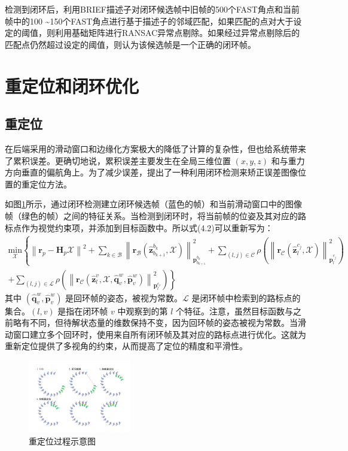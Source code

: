 检测到闭环后，利用BRIEF描述子对闭环候选帧中旧帧的500个FAST角点和当前帧中的100 \textasciitilde 150个FAST角点进行基于描述子的邻域匹配，如果匹配的点对大于设定的阈值，则利用基础矩阵进行RANSAC异常点剔除。如果经过异常点剔除后的匹配点仍然超过设定的阈值，则认为该候选帧是一个正确的闭环帧。
\section{重定位和闭环优化}
\subsection{重定位}
在后端采用的滑动窗口和边缘化方案极大的降低了计算的复杂性，但也给系统带来了累积误差。更确切地说，累积误差主要发生在全局三维位置 $(x,y,z) $ 和与重力方向垂直的偏航角上。为了减少误差，提出了一种利用闭环检测来矫正误差图像位置的重定位方法。

如图\ref{fig4_8}所示，通过闭环检测建立闭环候选帧（蓝色的帧）和当前滑动窗口中的图像帧（绿色的帧）之间的特征关系。当检测到闭环时，将当前帧的位姿及其对应的路标点作为视觉约束项，并添加到目标函数中。所以式(4.2)可以重新写为：
 \begin{equation}
\label{eqn:4.34}
\begin{split}
\underset{\mathcal{X}}{\text{min}}\left\{\left\| \mathbf{r}_p-\mathbf{H}_p\mathcal{X} \right\|^2+
\sum_{k\in\mathcal{B}}\left\| \mathbf{r}_\mathcal{B}(\hat{\mathbf{z}}_{b_{k+1}}^{b_k},\mathcal{X}) \right\|
_{\mathbf{p}_{b_{k+1}}^{b_k}}^2 \right.  + 
\sum_{(l,j)\in\mathcal{C}}\rho(\left\| \mathbf{r}_\mathcal{C}(\hat{\mathbf{z}}_l^{c_j},\mathcal{X}) 
\right\|_{\mathbf{p}_l^{c_j}}^2) \\ + 
\left.\sum_{(l,j)\in\mathcal{L}}\rho(\left\|\mathbf{r}_\mathcal{C}(\hat{\mathbf{z}}_l^v,\mathcal{X},\hat{\mathbf{q}}_v^w,\hat{\mathbf{p}}_v^w) \right\|_{\mathbf{p}_l^{c_v}}^2) \right\}
\end{split}
\end{equation}
其中 $(\hat{\mathbf{q}}_v^w,\hat{\mathbf{p}}_v^w) $ 是回环帧的姿态，被视为常数。$\mathcal{L} $ 是闭环帧中检索到的路标点的集合。$(l,v) $ 是指在闭环帧 $v $ 中观察到的第 $l $ 个特征。注意，虽然目标函数与之前略有不同，但待解状态量的维数保持不变，因为回环帧的姿态被视为常数。当滑动窗口建立多个回环时，使用来自所有闭环帧及其对应的路标点进行优化。这就为重新定位提供了多视角的约束，从而提高了定位的精度和平滑性。
\begin{figure}[h]\setlength{\belowcaptionskip}{-12pt}
	\centering
	\includegraphics[width=0.4\textwidth, angle=-90]{figures/chapter4/fig4_8}
	\caption{重定位过程示意图}\label{fig4_8}
\end{figure}
